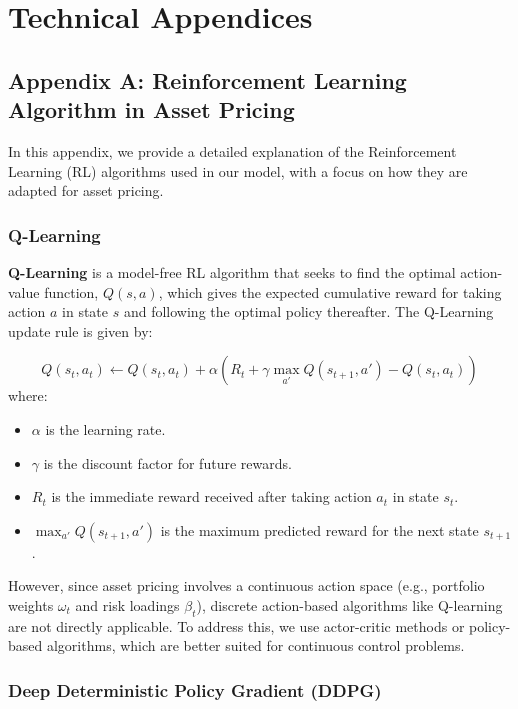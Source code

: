 \section{Technical Appendices}

\subsection*{Appendix A: Reinforcement Learning Algorithm in Asset Pricing}

In this appendix, we provide a detailed explanation of the Reinforcement Learning (RL) algorithms used in our model, with a focus on how they are adapted for asset pricing.

\subsubsection*{Q-Learning}

\textbf{Q-Learning} is a model-free RL algorithm that seeks to find the optimal action-value function, $Q(s, a)$, which gives the expected cumulative reward for taking action $a$ in state $s$ and following the optimal policy thereafter. The Q-Learning update rule is given by:

\[
Q(s_t, a_t) \leftarrow Q(s_t, a_t) + \alpha \left( R_t + \gamma \max_{a'} Q(s_{t+1}, a') - Q(s_t, a_t) \right)
\]
where:
\begin{itemize}
    \item $\alpha$ is the learning rate.
    \item $\gamma$ is the discount factor for future rewards.
    \item $R_t$ is the immediate reward received after taking action $a_t$ in state $s_t$.
    \item $\max_{a'} Q(s_{t+1}, a')$ is the maximum predicted reward for the next state $s_{t+1}$.
\end{itemize}

However, since asset pricing involves a continuous action space (e.g., portfolio weights $\omega_t$ and risk loadings $\beta_t$), discrete action-based algorithms like Q-learning are not directly applicable. To address this, we use actor-critic methods or policy-based algorithms, which are better suited for continuous control problems.

\subsubsection*{Deep Deterministic Policy Gradient (DDPG)}

